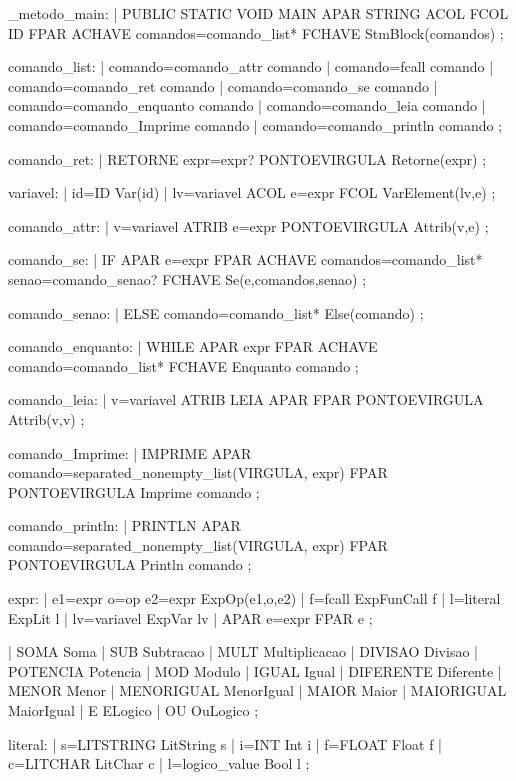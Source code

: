 \documentclass[12pt,a4paper,twoside]{report}
\begin{document}
\begin{terminal}
_metodo_main:
    | PUBLIC STATIC VOID MAIN APAR STRING ACOL FCOL ID FPAR ACHAVE comandos=comando_list* FCHAVE{ StmBlock(comandos)}
    ;

comando_list:
    | comando=comando_attr {comando}
    | comando=fcall {comando}
    | comando=comando_ret {comando}
    | comando=comando_se {comando}
    | comando=comando_enquanto {comando}
    | comando=comando_leia {comando}
    | comando=comando_Imprime {comando}
    | comando=comando_println {comando}
    ;

comando_ret:
    | RETORNE expr=expr? PONTOEVIRGULA { Retorne(expr)}
    ;

variavel: 
    | id=ID { Var(id) }
    | lv=variavel ACOL e=expr FCOL {VarElement(lv,e)}
    ;


comando_attr:
    | v=variavel ATRIB e=expr PONTOEVIRGULA { Attrib(v,e) }
    ;

comando_se:
    | IF APAR e=expr FPAR ACHAVE comandos=comando_list* senao=comando_senao? FCHAVE { Se(e,comandos,senao)}
    ;

comando_senao:
    | ELSE comando=comando_list* { Else(comando) }
    ;
	
	

comando_enquanto:
    | WHILE APAR expr FPAR ACHAVE comando=comando_list* FCHAVE { Enquanto comando }
    ;


comando_leia:
    | v=variavel ATRIB LEIA APAR FPAR PONTOEVIRGULA { Attrib(v,v) }
    ;
	
	

comando_Imprime:
    | IMPRIME APAR comando=separated_nonempty_list(VIRGULA, expr) FPAR PONTOEVIRGULA {Imprime comando}
    ;

comando_println:
    | PRINTLN APAR comando=separated_nonempty_list(VIRGULA, expr) FPAR PONTOEVIRGULA {Println comando }
    ;
	
	
expr:  
   | e1=expr o=op e2=expr { ExpOp(e1,o,e2) }
   | f=fcall { ExpFunCall f }
   | l=literal { ExpLit l }
   | lv=variavel { ExpVar lv } 
   | APAR e=expr FPAR { e }
   ;
   

   

  | SOMA { Soma }
  | SUB  { Subtracao }
  | MULT { Multiplicacao }
  | DIVISAO { Divisao }
  | POTENCIA { Potencia }
  | MOD { Modulo }
  | IGUAL { Igual }
  | DIFERENTE { Diferente }
  | MENOR { Menor }
  | MENORIGUAL { MenorIgual }
  | MAIOR { Maior }
  | MAIORIGUAL { MaiorIgual }
  | E { ELogico }
  | OU { OuLogico }
  ;

  

literal:
  | s=LITSTRING { LitString s}
  | i=INT { Int i}
  | f=FLOAT { Float f}
  | c=LITCHAR { LitChar c}
  | l=logico_value { Bool l}
  ;


\end{terminal}
\end{document}
